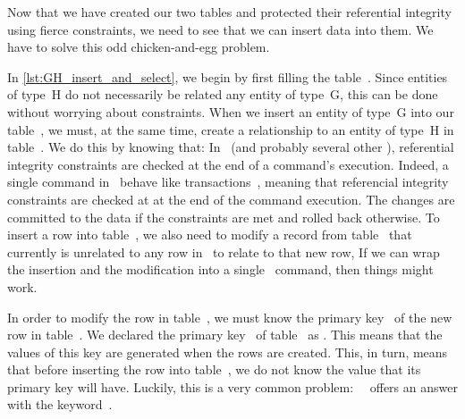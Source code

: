 Now that we have created our two tables and protected their referential integrity using fierce constraints, we need to see that we can insert data into them.
We have to solve this odd chicken-and-egg problem.

In \cref{lst:GH_insert_and_select}, we begin by first filling the table~.
Since entities of type~H do not necessarily be related any entity of type~G, this can be done without worrying about constraints.
When we insert an entity of type~G into our table~, we must, at the same time, create a relationship to an entity of type~H in table~.
We do this by knowing that:%
%
%
%
In \postgresql~(and probably several other ), referential integrity constraints are checked at the end of a command's execution.
Indeed, a single command in \postgresql\ behave like transactions~\cite{PGDG:T}, meaning that referencial integrity constraints are checked at at the end of the command execution.
The changes are committed to the data if the constraints are met and rolled back otherwise.
To insert a row into table~, we also need to modify a record from table~ that currently is unrelated to any row in~ to relate to that new row,
If we can wrap the insertion and the modification into a single \sql\ command, then things might work.

In order to modify the row in table~, we must know the primary key~ of the new row in table~.
We declared the primary key~ of table~ as .
This means that the values of this key are generated when the rows are created.
This, in turn, means that before inserting the row into table~, we do not know the value that its primary key will have.
Luckily, this is a very common problem:~
\postgresql\ offers an answer with the  keyword~\cite{PGDG:PD:RDFMR,SE:DA:2020WDSSOAOTNPSDIOR}.

